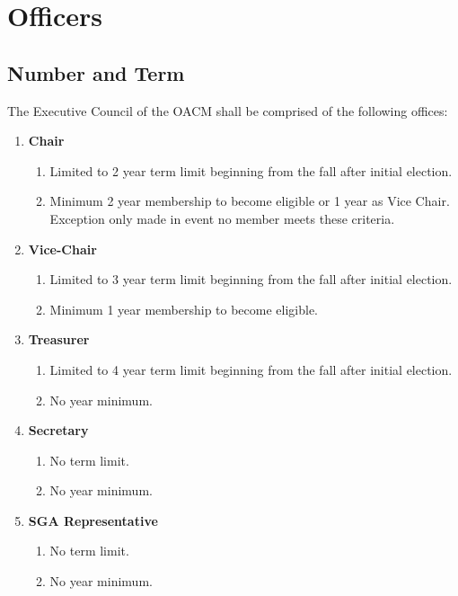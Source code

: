 \documentclass[letterpaper, 12pt]{article}
\begin{document}
\section{Officers}
\subsection{Number and Term}
The Executive Council of the OACM shall be comprised of the following offices:
\begin{enumerate}
    \item \textbf{Chair}
        \begin{enumerate}
            \item Limited to 2 year term limit beginning from the fall after 
                initial election.
            \item Minimum 2 year membership to become eligible or 1 year as 
                Vice Chair. Exception only made in event no member meets 
                these criteria.
        \end{enumerate}
    \item \textbf{Vice-Chair}
        \begin{enumerate}
            \item Limited to 3 year term limit beginning from the fall after 
                initial election.
            \item Minimum 1 year membership to become eligible. 
        \end{enumerate}
    \item \textbf{Treasurer}
        \begin{enumerate}
            \item Limited to 4 year term limit beginning from the fall after 
                initial election.
            \item No year minimum.
        \end{enumerate}
    \item \textbf{Secretary}
        \begin{enumerate}
            \item No term limit.
            \item No year minimum.
        \end{enumerate}
    \item \textbf{SGA Representative}
        \begin{enumerate}
            \item No term limit.
            \item No year minimum.
        \end{enumerate}
\end{enumerate}
\end{document}
